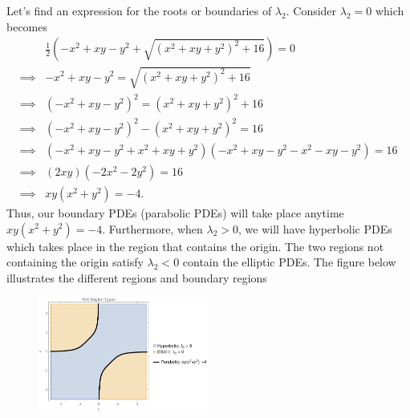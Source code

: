 \documentclass[a4paper,12pt]{article}
\begin{document}
\begin{enumerate}[label = \textbf{(\alph*)}]
            Let's find an expression for the roots or boundaries of $ \lambda_2 $. Consider $ \lambda_2 = 0 $ which becomes
            \begin{align*}
                & \frac{1}{2} \left(-x^2 + x y - y^2 + \sqrt{\left(x^2+x y+y^2\right)^2+16} \right) = 0 \\
                \implies & -x^2 + x y - y^2 = \sqrt{\left(x^2+x y+y^2\right)^2+16} \\
                \implies & \left(-x^2 + x y - y^2 \right)^2 = \left(x^2+x y+y^2\right)^2 +16 \\
                \implies & \left(-x^2 + x y - y^2 \right)^2 - \left(x^2+x y+y^2\right)^2 = 16 \\
                \implies & \left(-x^2 + x y - y^2 + x^2+x y+y^2\right)\left(-x^2 + x y - y^2 - x^2 - x y - y^2\right) = 16\\
                \implies & \left(2x y\right)\left(-2x^2 - 2y^2\right) = 16 \\
                \implies & x y\left(x^2 + y^2\right) = -4.
            \end{align*}
            Thus, our boundary PDEs (parabolic PDEs) will take place anytime $ x y\left(x^2 + y^2\right) = -4 $. Furthermore, when $ \lambda_2 > 0 $, we will have hyperbolic PDEs which takes place in the region that contains the origin. The two regions not containing the origin satisfy $ \lambda_2 < 0 $ contain the elliptic PDEs. The figure below illustrates the different regions and boundary regions
            \begin{figure}[h!]
                \centering
                \includegraphics[width = 0.5\textwidth]{images/PDE_Types.png}
            \end{figure}
     \end{enumerate}
\end{document}
